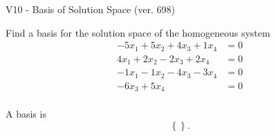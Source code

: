 \begin{exercise}
  \begin{exerciseTitle}V10 - Basis of Solution Space (ver. 698)\end{exerciseTitle}
  \begin{exerciseStatement}
    Find a basis for the solution space of the homogeneous system 
\begin{align*}
 -5 x_ 1 + 5 x_ 2 + 4 x_ 3 + 1 x_ 4 &= 0  \\ 
  4 x_ 1 + 2 x_ 2 -2 x_ 3 + 2 x_ 4 &= 0  \\ 
  -1 x_ 1 -1 x_ 2 -4 x_ 3 -3 x_ 4 &= 0  \\ 
  -6 x_ 3 + 5 x_ 4 &= 0  \\ 
 \end{align*}


 
  \end{exerciseStatement}

  \begin{exerciseAnswer}
   A basis is   
\[\left\{\right\}.\]

  


  \end{exerciseAnswer}
\end{exercise}
